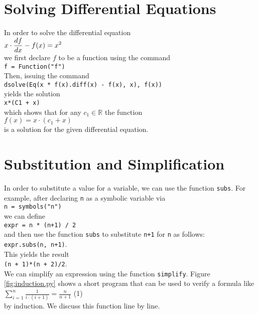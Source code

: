 \documentclass{report}
\begin{document}
\section{Solving Differential Equations}
In order to solve the differential equation
\\[0.2cm]
\hspace*{1.3cm}
$\displaystyle x \cdot \frac{d\hspace{0.1pt}f}{dx} - f(x) = x^2$
\\[0.2cm]
we first declare $f$ to be a function using the command 
\\[0.2cm]
\hspace*{1.3cm}
\texttt{f = Function("f")}
\\[0.2cm]
Then, issuing the command
\\[0.2cm]
\hspace*{1.3cm}
\texttt{dsolve(Eq(x * f(x).diff(x) - f(x), x), f(x))}
\\[0.2cm]
yields the solution
\\[0.2cm]
\hspace*{1.3cm}
\texttt{x*(C1 + x)}
\\[0.2cm]
which shows that for any $c_1 \in \mathbb{R}$ the function
\\[0.2cm]
\hspace*{1.3cm}
$f(x) = x \cdot (c_{1} + x)$
\\[0.2cm]
is a solution for the given differential equation.

\section{Substitution and Simplification}
In order to substitute a value for a variable, we can use the function \texttt{subs}.  For
example, after declaring \texttt{n} as a symbolic variable via
\\[0.2cm]
\hspace*{1.3cm}
\texttt{n = symbols("n")}
\\[0.2cm]
we can define
\\[0.2cm]
\hspace*{1.3cm}
\texttt{expr = n * (n+1) / 2}
\\[0.2cm]
and then use the function \texttt{subs} to substitute \texttt{n+1} for \texttt{n} as follows:
\\[0.2cm]
\hspace*{1.3cm}
\texttt{expr.subs(n, n+1)}.
\\[0.2cm]
This yields the result
\\[0.2cm]
\hspace*{1.3cm}
\texttt{(n + 1)*(n + 2)/2}.
\\[0.2cm]
We can simplify an expression using the function \texttt{simplify}.
Figure \ref{fig:induction.py} shows a short program that can be used to verify a formula like
\\[0.2cm]
\hspace*{1.3cm}
$\displaystyle  \sum\limits_{i=1}^n \frac{1}{i \cdot (i+1)} = \frac{n}{n+1}$ \hspace*{\fill} (1)
\\[0.2cm]
by induction.  We discuss this function line by line.
\end{document}
